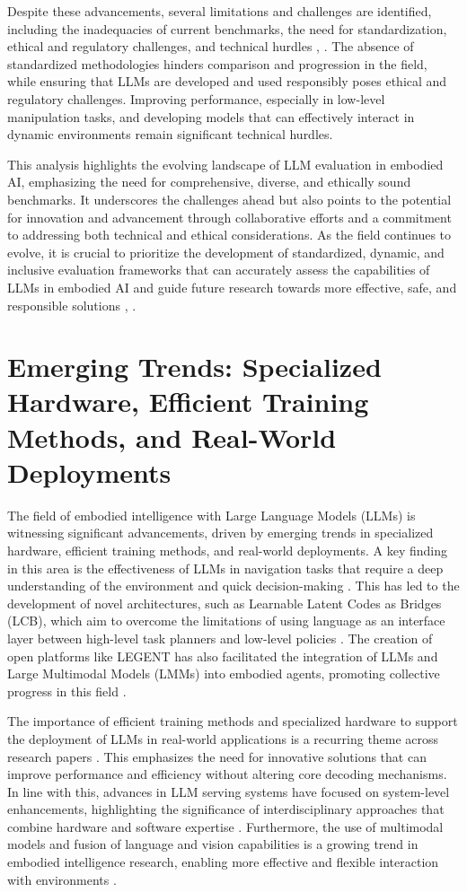 \documentclass[conference]{IEEEtran}
\begin{document}
Despite these advancements, several limitations and challenges are identified, including the inadequacies of current benchmarks, the need for standardization, ethical and regulatory challenges, and technical hurdles \cite{b5}, \cite{b6}. The absence of standardized methodologies hinders comparison and progression in the field, while ensuring that LLMs are developed and used responsibly poses ethical and regulatory challenges. Improving performance, especially in low-level manipulation tasks, and developing models that can effectively interact in dynamic environments remain significant technical hurdles.

This analysis highlights the evolving landscape of LLM evaluation in embodied AI, emphasizing the need for comprehensive, diverse, and ethically sound benchmarks. It underscores the challenges ahead but also points to the potential for innovation and advancement through collaborative efforts and a commitment to addressing both technical and ethical considerations. As the field continues to evolve, it is crucial to prioritize the development of standardized, dynamic, and inclusive evaluation frameworks that can accurately assess the capabilities of LLMs in embodied AI and guide future research towards more effective, safe, and responsible solutions \cite{b1}, \cite{b6}.

\section{Emerging Trends: Specialized Hardware, Efficient Training Methods, and Real-World Deployments}
The field of embodied intelligence with Large Language Models (LLMs) is witnessing significant advancements, driven by emerging trends in specialized hardware, efficient training methods, and real-world deployments. A key finding in this area is the effectiveness of LLMs in navigation tasks that require a deep understanding of the environment and quick decision-making \cite{b2}. This has led to the development of novel architectures, such as Learnable Latent Codes as Bridges (LCB), which aim to overcome the limitations of using language as an interface layer between high-level task planners and low-level policies \cite{b3}. The creation of open platforms like LEGENT has also facilitated the integration of LLMs and Large Multimodal Models (LMMs) into embodied agents, promoting collective progress in this field \cite{b4}.

The importance of efficient training methods and specialized hardware to support the deployment of LLMs in real-world applications is a recurring theme across research papers \cite{b1, b5}. This emphasizes the need for innovative solutions that can improve performance and efficiency without altering core decoding mechanisms. In line with this, advances in LLM serving systems have focused on system-level enhancements, highlighting the significance of interdisciplinary approaches that combine hardware and software expertise \cite{b1}. Furthermore, the use of multimodal models and fusion of language and vision capabilities is a growing trend in embodied intelligence research, enabling more effective and flexible interaction with environments \cite{b2, b4}.
\end{document}
